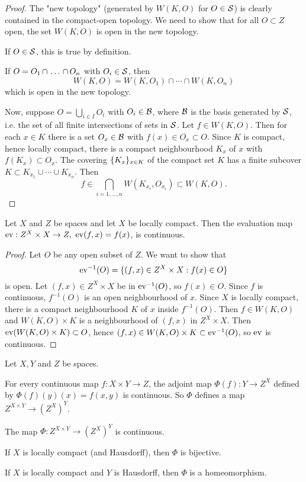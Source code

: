 \begin{proof}
The "new topology" (generated by $W(K,O)$ for $O\in\S$) is clearly contained in the compact-open topology. We need to show that for all $O\subset Z$ open, the set $W(K,O)$ is open in the new topology.

If $O\in\S$, this is true by definition.

If $O=\nns{O}{\cap}{n}$ with $O_i\in\S$, then
\[W(K,O)=W(K,O_1)\cap\cdots\cap W(K,O_n)\]
which is open in the new topology.

Now, suppose $O=\bigcup_{i\in I}O_i$ with $O_i\in\Bb$, where $\Bb$ is the basis generated by $\S$, i.e. the set of all finite intersections of sets in $\S$. Let $f\in W(K,O)$. Then for each $x\in K$ there is a set $O_x\in\Bb$ with $f(x)\in O_x\subset O$. Since $K$ is compact, hence locally compact, there is a compact neighbourhood $K_x$ of $x$ with $f(K_x)\subset O_x$. The covering $\cb{K_x}_{x\in K}$ of the compact set $K$ has a finite subcover $K\subset K_{x_1}\cup\cdots\cup K_{x_n}$. Then
\[f\in \bigcap_{i=1,\dots,n}W(K_{x_i},O_{x_i})\subset W(K,O).\]
\end{proof}

\begin{theorem}
Let $X$ and $Z$ be spaces and let $X$ be locally compact. Then the evaluation map $\ev:Z^X\times X\to Z,\ \ev(f,x)=f(x)$, is continuous.
\end{theorem}

\begin{proof}
Let $O$ be any open subset of $Z$. We want to show that
\[\ev^{-1}(O)=\cb{(f,x)\in Z^X\times X:f(x)\in O}\]
is open. Let $(f,x)\in Z^X\times X$ be in $\ev^{-1}(O)$, so $f(x)\in O$. Since $f$ is continuous, $f^{-1}(O)$ is an open neighbourhood of $x$. Since $X$ is locally compact, there is a compact neighbourhood $K$ of $x$ inside $f^{-1}(O)$. Then $f\in W(K,O)$ and $W(K,O)\times K$ is a neighbourhood of $(f,x)$ in $Z^X\times X$. Then $\ev(W(K,O)\times K)\subset O$, hence $(f,x)\in W(K,O)\times K\subset\ev^{-1}(O)$, so $\ev$ is continuous.
\end{proof}

\begin{theorem}\label{theorem:exponential-law}
Let $X,Y$ and $Z$ be spaces.
\begin{numerate}
    \setcounter{enumi}{-1}
    \item For every continuous map $f:X\times Y\to Z$, the adjoint map $\Phi(f):Y\to Z^X$ defined by $\Phi(f)(y)(x)=f(x,y)$ is continuous. So $\Phi$ defines a map $Z^{X\times Y}\to(Z^X)^Y$.
    \item The map $\Phi:Z^{X\times Y}\to(Z^X)^Y$ is continuous.
    \item If $X$ is locally compact (and Hausdorff), then $\Phi$ is bijective.
    \item If $X$ is locally compact and $Y$ is Hausdorff, then $\Phi$ is a homeomorphism.
\end{numerate}
\end{theorem}

